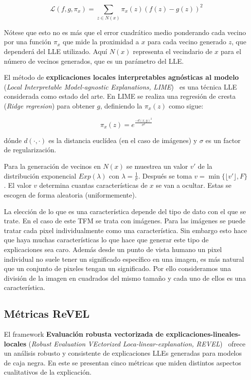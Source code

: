 \begin{equation}
\mathcal{L}(f,g,\pi_x) = \sum_{z \in N(x)} \pi_x(z)(f(z)-g(z))^2
\end{equation} 

Nótese que esto no es más que el error cuadrático medio ponderando cada vecino por una función $\pi_x$ que mide la proximidad a $x$ para cada vecino generado $z$, que dependerá del LLE utilizado.  Aquí $N(x)$ representa el vecindario de $x$ para el número de vecinos generados, que es un parámetro del LLE.


El método de \textbf{explicaciones locales interpretables agnósticas al modelo} (\textit{Local Interpretable Model-agnostic Explanations, LIME})~\cite{REVEL,LIME} es una técnica LLE considerada como estado del arte. En LIME se realiza una regresión de cresta (\textit{Ridge regresion}) para obtener $g$, definiendo la $\pi_x(z)$ como sigue:

\begin{equation}
\pi_x(z) = e^{\frac{-d(x,y)^2}{\sigma^2}}
\end{equation}

dónde $d(\cdot,\cdot)$ es la distancia euclídea (en el caso de imágenes) y $\sigma$ es un factor de regularización.

Para la generación de vecinos en $N(x)$ se muestrea un valor $v'$ de la distribución exponencial $Exp(\lambda)$ con $\lambda = \frac{1}{\sigma}$. Después se toma $v = \min\{\lfloor v' \rfloor, F\}$. El valor $v$ determina cuantas características de $x$ se van a ocultar. Estas se escogen de forma aleatoria (uniformemente).

La elección de lo que es una característica depende del tipo de dato con el que se trate. En el caso de este TFM se trata con imágenes. Para las imágenes se puede tratar cada pixel individualmente como una característica. Sin embargo esto hace que haya muchas características lo que hace que generar este tipo de explicaciones sea caro. Además desde un punto de vista humano un pixel individual no suele tener un significado específico en una imagen, es más natural que un conjunto de pixeles tengan un significado. Por ello consideramos una división de la imagen en cuadrados del mismo tamaño y cada uno de ellos es una característica.

\subsection{Métricas ReVEL} \label{subsec:revel}

El framework \textbf{Evaluación robusta vectorizada de explicaciones-lineales-locales} (\textit{Robust Evaluation VEctorized Loca-linear-explanation, REVEL})~\cite{REVEL} ofrece un análisis robusto y consistente de explicaciones LLEs generadas para modelos de caja negra. En este se presentan cinco métricas que miden distintos aspectos cualitativos de la explicación. 

